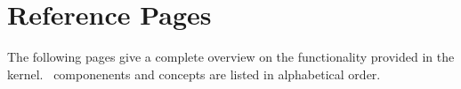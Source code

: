\chapter{Reference Pages}
The following pages give a complete overview on the functionality provided 
in the kernel. \cgal\ componenents and concepts are listed in alphabetical
order.

